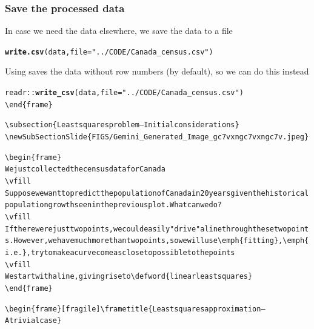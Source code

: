 \documentclass[aspectratio=169]{beamer}\usepackage[]{graphicx}\usepackage[]{xcolor}
\makeatletter
\newcommand{\hlsng}[1]{\textcolor[rgb]{0.192,0.494,0.8}{#1}}%
\newcommand{\hldef}[1]{\textcolor[rgb]{0.345,0.345,0.345}{#1}}%
\newcommand{\hlkwc}[1]{\textcolor[rgb]{0.333,0.667,0.333}{#1}}%
\newcommand{\hlkwd}[1]{\textcolor[rgb]{0.737,0.353,0.396}{\textbf{#1}}}%
\newenvironment{kframe}{%
 \def\at@end@of@kframe{}%
 \ifinner\ifhmode%
  \def\at@end@of@kframe{\end{minipage}}%
  \begin{minipage}{\columnwidth}%
 \fi\fi%
 \def\FrameCommand##1{\hskip\@totalleftmargin \hskip-\fboxsep
 \colorbox{shadecolor}{##1}\hskip-\fboxsep
     \hskip-\linewidth \hskip-\@totalleftmargin \hskip\columnwidth}%
 \MakeFramed {\advance\hsize-\width
   \@totalleftmargin\z@ \linewidth\hsize
   \@setminipage}}%
 {\par\unskip\endMakeFramed%
 \at@end@of@kframe}
\newenvironment{knitrout}{}{} %
\makeatother
\begin{document}
\begin{frame}[fragile]\frametitle{Save the processed data}
In case we need the data elsewhere, we save the data to a  file
\vfill
\begin{knitrout}
\color{fgcolor}\begin{kframe}
\begin{alltt}
\hlkwd{write.csv}\hldef{(data,} \hlkwc{file} \hldef{=} \hlsng{"../CODE/Canada_census.csv"}\hldef{)}
\end{alltt}
\end{kframe}
\end{knitrout}
\vfill
Using  saves the data without row numbers (by default), so we can do this instead
\vfill
\begin{knitrout}
\color{fgcolor}\begin{kframe}
\begin{alltt}
readr::\hlkwd{write_csv}(data, file = \hlsng{"../CODE/Canada_census.csv"})
\textbackslash{}end\{frame\}

\textbackslash{}subsection\{Least squares problem -- Initial considerations\}
\textbackslash{}newSubSectionSlide\{FIGS/Gemini_Generated_Image_gc7vxngc7vxngc7v.jpeg\}

\textbackslash{}begin\{frame\}
We just collected the census data for Canada
\textbackslash{}vfill
Suppose we want to predict the population of Canada in 20 years given the historical population growth seen in the previous plot. What can we do?
\textbackslash{}vfill
If there were just two points, we could easily \hlsng{"drive"} a line through these two points. However, we have much more than two points, so we will use \textbackslash{}emph\{fitting\}, \textbackslash{}emph\{i.e.\}, try to make a curve come as close to possible to the points
\textbackslash{}vfill
We start with a line, giving rise to \textbackslash{}defword\{linear least squares\}
\textbackslash{}end\{frame\}

\textbackslash{}begin\{frame\}[fragile]\textbackslash{}frametitle\{Least squares approximation -- A trivial case\}
\end{alltt}



\end{kframe}
\end{knitrout}
\end{frame}
\end{document}
